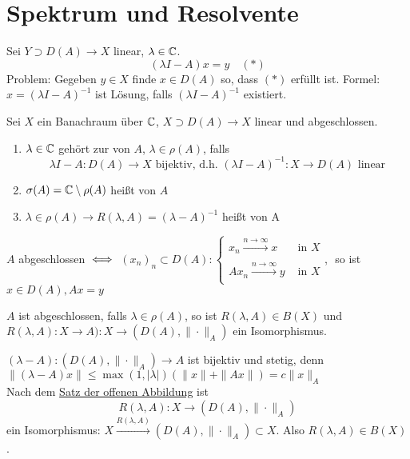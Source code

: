 
\section{Spektrum und Resolvente}



Sei $Y \supset D(A) \rightarrow X$ linear, $\lambda \in \mathbb{C}$.
	\[ (\lambda I - A) x = y \quad (*) \label{eq:13.0-lineareGleichung} \]
Problem: Gegeben $y \in X$ finde $x \in D(A)$ so, dass \hyperref[eq:13.0-lineareGleichung]{$(*)$} erfüllt ist.
Formel: $x = (\lambda I - A)^{-1}$ ist Lösung, falls $(\lambda I - A)^{-1}$ existiert.


\begin{definition}
	Sei $X$ ein Banachraum über $\mathbb{C}$, $X \supset D(A) \rightarrow X$ linear und abgeschlossen.
	\begin{enumerate}[label=\alph*\upshape)]
		\item $\lambda \in \mathbb{C}$ gehört zur  von $A$, $\lambda \in \rho(A)$, falls
			\[ \lambda I - A : D(A) \rightarrow X \text{ bijektiv, d.h. } (\lambda I - A)^{-1}: X \rightarrow D(A) \text{ linear} \]
		\item $\sigma(A) = \mathbb{C} \setminus \rho(A)$ hei{\ss}t  von $A$
		\item $\lambda \in \rho(A) \rightarrow R(\lambda, A) = (\lambda - A)^{-1}$ hei{\ss}t  von A
	\end{enumerate}	
\end{definition}


\begin{erinnerung}
	$A$ abgeschlossen $\iff$ $(x_{n})_{n} \subset D(A): \begin{cases}
			x_{n} \xrightarrow[]{n \rightarrow \infty} x & \text{ in } X \\ A x_{n} \xrightarrow[]{n \rightarrow \infty} y & \text{ in } X \end{cases}$, $ $ so ist $x \in D(A), A x = y$\end{erinnerung}


\begin{bemerkung}
	$A$ ist abgeschlossen, falls $\lambda \in \rho(A)$, so ist $R(\lambda, A) \in B(X)$ und $R(\lambda, A): X \rightarrow A): X \rightarrow (D(A), \| \cdot \|_{A})$ ein Isomorphismus.
\end{bemerkung}

\begin{beweis}
	$(\lambda - A): (D(A), \| \cdot \|_{A}) \rightarrow A$ ist bijektiv und stetig, denn $\|(\lambda - A)x \| \leq \max(1, |\lambda|) (\|x\| + \|Ax\|) = c \| x \|_{A}$ \\
	Nach dem \hyperref[satz:10.3-offeneAbbildung]{Satz der offenen Abbildung} ist
		\[ R(\lambda, A): X \rightarrow (D(A), \| \cdot \|_{A}) \]
	ein Isomorphismus: $X \xrightarrow[]{R(\lambda, A)} (D(A), \| \cdot \|_{A}) \subset X$. Also $R(\lambda, A) \in B(X)$.
\end{beweis}


